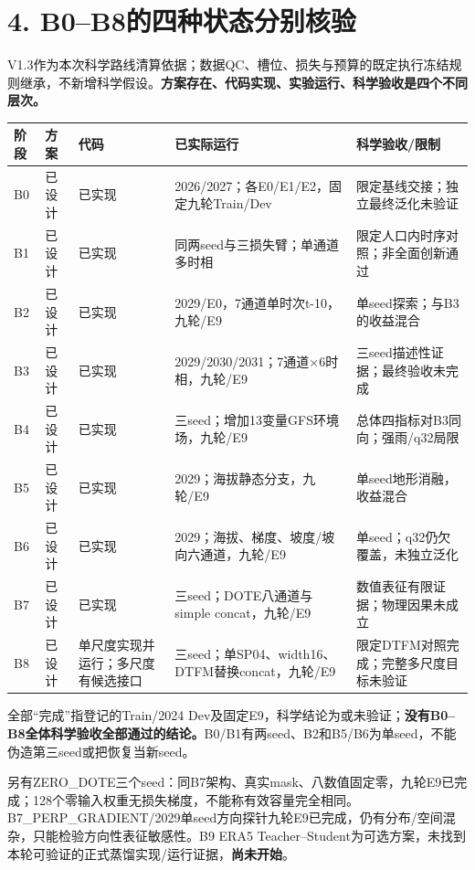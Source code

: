 \documentclass[UTF8,a4paper,10pt,fontset=none]{ctexart}
\newcommand{\key}[1]{\textcolor{ink}{\textbf{#1}}}
\begin{document}
\clearpage
\section*{4. B0--B8的四种状态分别核验}
V1.3作为本次科学路线清算依据；数据QC、槽位、损失与预算的既定执行冻结规则继承，不新增科学假设。\textbf{方案存在、代码实现、实验运行、科学验收是四个不同层次。}

\begin{center}\small
\begin{tabular}{@{}p{12mm}p{17mm}p{35mm}p{56mm}p{46mm}@{}}
\toprule
阶段 & 方案 & 代码 & 已实际运行 & 科学验收/限制 \\
\midrule
B0 & 已设计 & 已实现 & 2026/2027；各E0/E1/E2，固定九轮Train/Dev & 限定基线交接；独立最终泛化未验证 \\
B1 & 已设计 & 已实现 & 同两seed与三损失臂；单通道多时相 & 限定人口内时序对照；非全面创新通过 \\
B2 & 已设计 & 已实现 & 2029/E0，7通道单时次t-10，九轮/E9 & 单seed探索；与B3的收益混合 \\
B3 & 已设计 & 已实现 & 2029/2030/2031；7通道×6时相，九轮/E9 & 三seed描述性证据；最终验收未完成 \\
B4 & 已设计 & 已实现 & 三seed；增加13变量GFS环境场，九轮/E9 & 总体四指标对B3同向；强雨/q32局限 \\
B5 & 已设计 & 已实现 & 2029；海拔静态分支，九轮/E9 & 单seed地形消融，收益混合 \\
B6 & 已设计 & 已实现 & 2029；海拔、梯度、坡度/坡向六通道，九轮/E9 & 单seed；q32仍欠覆盖，未独立泛化 \\
B7 & 已设计 & 已实现 & 三seed；DOTE八通道与simple concat，九轮/E9 & 数值表征有限证据；物理因果未成立 \\
B8 & 已设计 & 单尺度实现并运行；多尺度有候选接口 & 三seed；单SP04、width16、DTFM替换concat，九轮/E9 & 限定DTFM对照完成；完整多尺度目标未验证 \\
\bottomrule
\end{tabular}\end{center}

全部“完成”指登记的Train/2024 Dev及固定E9，科学结论为或未验证；\textbf{没有B0--B8全体科学验收全部通过的结论。}B0/B1有两seed、B2和B5/B6为单seed，不能伪造第三seed或把恢复当新seed。

另有ZERO\_DOTE三个seed：同B7架构、真实mask、八数值固定零，九轮E9已完成；128个零输入权重无损失梯度，不能称有效容量完全相同。B7\_PERP\_GRADIENT/2029单seed方向探针九轮E9已完成，仍有分布/空间混杂，只能检验方向性表征敏感性。B9 ERA5 Teacher--Student为可选方案，未找到本轮可验证的正式蒸馏实现/运行证据，\key{尚未开始}。
\end{document}
